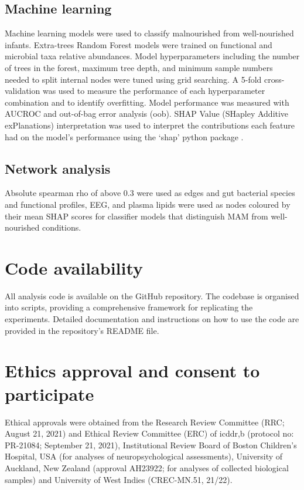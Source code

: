 \documentclass{article}
\begin{document}
\subsection*{Machine learning}
Machine learning models were used to classify malnourished from well-nourished infants.
Extra-trees Random Forest models were trained on functional and microbial taxa relative abundances.
Model hyperparameters including the number of trees in the forest, maximum tree depth, and minimum sample numbers needed to split internal nodes were tuned using grid searching.
A 5-fold cross-validation was used to measure the performance of each hyperparameter combination and to identify overfitting.
Model performance was measured with AUCROC and out-of-bag error analysis (oob).
SHAP Value (SHapley Additive exPlanations) interpretation was used to interpret the contributions each feature had on the model's performance using the ‘shap’ python package \cite{lundberg2017unified}.

\subsection*{Network analysis}
Absolute spearman rho of above 0.3 were used as edges and gut bacterial species and functional profiles, EEG, and plasma lipids were used as nodes coloured by their mean SHAP scores for classifier models that distinguish \gls{MAM} from well-nourished conditions.

\section*{Code availability}
All analysis code is available on the GitHub repository.
The codebase is organised into scripts, providing a comprehensive framework for replicating the experiments.
Detailed documentation and instructions on how to use the code are provided in the repository's README file.

\section*{Ethics approval and consent to participate}
Ethical approvals were obtained from the Research Review Committee (RRC; August 21, 2021) and Ethical Review Committee (ERC) of icddr,b (protocol no: PR-21084; September 21, 2021), Institutional Review Board of Boston Children’s Hospital, USA (for analyses of neuropsychological assessments), University of Auckland, New Zealand (approval AH23922; for analyses of collected biological samples) and University of West Indies (CREC-MN.51, 21/22).
\end{document}
